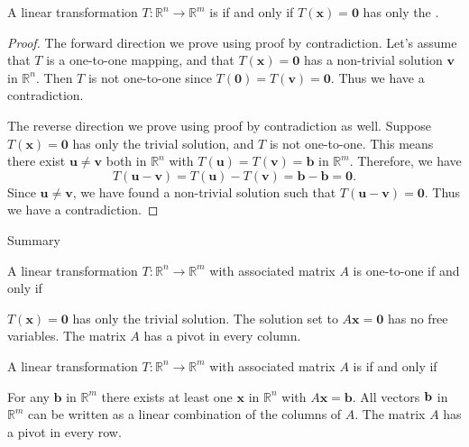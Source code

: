 \documentclass[xcolor=dvipsnames,aspectratio=169,t]{beamer}
\begin{document}
\begin{frame}

{\small
\begin{theorem}
A linear transformation $T: \mathbb{R}^n \to \mathbb{R}^m$ is  if and only if $T(\mathbf{x}) = \mathbf{0}$ has only the .
\end{theorem}

\smallskip

\begin{proof}
  \pause
  The forward direction we prove using proof by contradiction. Let's assume that $T$ is a one-to-one mapping, and that $T(\mathbf{x})=\mathbf{0}$ has a non-trivial solution $\mathbf{v}$ in $\mathbb{R}^n$.
  Then $T$ is not one-to-one since $T(\mathbf{0}) = T(\mathbf{v}) = \mathbf{0}$.
  Thus we have a contradiction.
  \medskip

  \pause
  The reverse direction we prove using proof by contradiction as well. Suppose $T(\mathbf{x}) = \mathbf{0}$ has only the trivial solution, and $T$ is not one-to-one. This means there exist $\mathbf{u} \ne \mathbf{v}$ both in $\mathbb{R}^n$ with $T(\mathbf{u})=T(\mathbf{v}) = \mathbf{b}$ in $\mathbb{R}^m$. 
  \pause
  Therefore, we have
  \[  T(\mathbf{u} -\mathbf{v}) = T(\mathbf{u}) - T(\mathbf{v}) = \mathbf{b} - \mathbf{b} = \mathbf{0}.\]
  Since $\mathbf{u} \ne \mathbf{v}$, we have found a non-trivial solution such that $T(\mathbf{u} -   \mathbf{v}) = \mathbf{0}$.
  Thus we have a contradiction.
\end{proof}
}

\end{frame}

\begin{frame}{Summary}

\bbox
A linear transformation $T: \mathbb{R}^n \to \mathbb{R}^m$ with associated matrix $A$ is \alert{one-to-one} if and only if 

\bi
\ii $T(\mathbf{x}) = \mathbf{0}$ has only the trivial solution.
\ii The solution set to $A \mathbf{x} = \mathbf{0}$ has no free variables.
\ii The matrix $A$ has a pivot in every column.
\ei
\ebox

\bbox
A linear transformation $T: \mathbb{R}^n \to \mathbb{R}^m$ with associated matrix $A$ is  if and only if 

\bi
\ii For any $\mathbf{b}$ in $\mathbb{R}^m$ there exists at least one $\mathbf{x}$ in $\mathbb{R}^n$ with $A \mathbf{x} = \mathbf{b}$.
\ii All vectors $\mathbf{b}$ in $\mathbb{R}^m$ can be written as a linear combination of the columns of $A$.
\ii The matrix $A$ has a pivot in every row.
\ii {}
\ei
\ebox

\end{frame}
\end{document}
